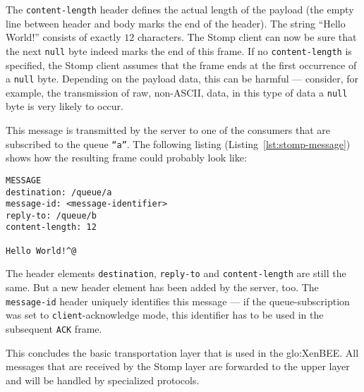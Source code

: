 The  \texttt{content-length}  header  defines  the actual  length  of  the
payload  (the empty  line between  header and  body marks  the end  of the
header).   The   string  ``Hello   World!''   consists  of   exactly  $12$
characters.  The Stomp client can  now be sure that the next \texttt{null}
byte indeed marks the end of this frame.  If no \texttt{content-length} is
specified,  the Stomp  client assumes  that the  frame ends  at  the first
occurrence of a  \texttt{null} byte.  Depending on the  payload data, this
can be  harmful ---  consider, for example,  the transmission of  raw, \ie
non-ASCII, data, in this type of  data a \texttt{null} byte is very likely
to occur.

This message is transmitted by the server to one of the consumers that are
subscribed   to   the  queue   \texttt{``a''}.    The  following   listing
(Listing~\ref{lst:stomp-message})  shows  how  the resulting  frame  could
probably look like:

\medskip
\begin{center}
  \begin{minipage}{.75\textwidth}
    \begin{lstlisting}[captionpos=b,backgroundcolor=\color{listingcolor},frame=lines,numbers=none,stepnumber=5,numberfirstline=false,numberstyle=\tiny,caption={The
        \texttt{MESSAGE} frame is used by the server to transmit a message
        to a client.},label={lst:stomp-message}]
MESSAGE
destination: /queue/a
message-id: <message-identifier>
reply-to: /queue/b
content-length: 12

Hello World!^@
    \end{lstlisting}
  \end{minipage}
\end{center}

The   header    elements   \texttt{destination},   \texttt{reply-to}   and
\texttt{content-length} are still  the same. But a new  header element has
been added  by the server,  too.  The \texttt{message-id}  header uniquely
identifies  this  message  ---   if  the  queue-subscription  was  set  to
\texttt{client}-acknowledge mode,  this identifier has  to be used  in the
subsequent \texttt{ACK} frame.

\medskip

This  concludes  the  basic  transportation  layer that  is  used  in  the
\gls{glo:XenBEE}. All  messages that are  received by the Stomp  layer are
forwarded to the upper layer and will be handled by specialized protocols.

